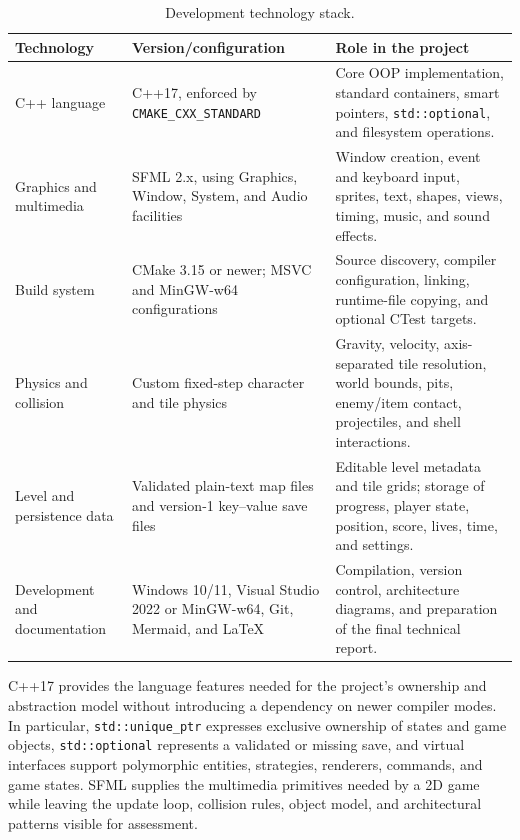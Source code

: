 \documentclass{template}
\begin{document}
\begin{table}[H]
    \centering
    \caption{Development technology stack.}
    \label{tab:technology-stack}
    \begin{tabularx}{\textwidth}{@{}p{3.5cm}XX@{}}
        \toprule
        \textbf{Technology} & \textbf{Version/configuration} &
        \textbf{Role in the project} \\
        \midrule
        C++ language & C++17, enforced by \texttt{CMAKE\_CXX\_STANDARD} & Core
        OOP implementation, standard containers, smart pointers,
        \texttt{std::optional}, and filesystem operations. \\
        Graphics and multimedia & SFML 2.x, using Graphics, Window, System, and
        Audio facilities & Window creation, event and keyboard input, sprites,
        text, shapes, views, timing, music, and sound effects. \\
        Build system & CMake 3.15 or newer; MSVC and MinGW-w64 configurations &
        Source discovery, compiler configuration, linking, runtime-file copying,
        and optional CTest targets. \\
        Physics and collision & Custom fixed-step character and tile physics &
        Gravity, velocity, axis-separated tile resolution, world bounds, pits,
        enemy/item contact, projectiles, and shell interactions. \\
        Level and persistence data & Validated plain-text map files and
        version-1 key--value save files & Editable level metadata and tile grids;
        storage of progress, player state, position, score, lives, time, and
        settings. \\
        Development and documentation & Windows 10/11, Visual Studio 2022 or
        MinGW-w64, Git, Mermaid, and LaTeX & Compilation, version control,
        architecture diagrams, and preparation of the final technical report. \\
        \bottomrule
    \end{tabularx}
\end{table}

C++17 provides the language features needed for the project's ownership and
abstraction model without introducing a dependency on newer compiler modes.
In particular, \texttt{std::unique\_ptr} expresses exclusive ownership of
states and game objects, \texttt{std::optional} represents a validated or
missing save, and virtual interfaces support polymorphic entities, strategies,
renderers, commands, and game states. SFML supplies the multimedia primitives
needed by a 2D game while leaving the update loop, collision rules, object
model, and architectural patterns visible for assessment.
\end{document}

